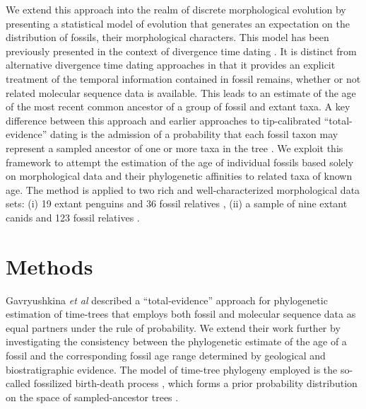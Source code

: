 \documentclass[11pt]{article}
\begin{document}
We extend this approach into the realm of discrete morphological evolution by presenting a statistical model of evolution that generates an expectation on the distribution of fossils, their morphological characters. 
This model has been previously presented in the context of divergence time dating \cite{gavr2014,gavryushkina2015bayesian}. 
It is distinct from alternative divergence time dating approaches in that it provides an explicit treatment of the temporal information contained in fossil remains, whether or not related molecular sequence data is available. 
This leads to an estimate of the age of the most recent common ancestor of a group of fossil and extant taxa. A key difference between this approach and earlier approaches to tip-calibrated ``total-evidence'' dating \cite{Ronq2012} is the admission of a probability that each fossil taxon may represent a sampled ancestor of one or more taxa  in the tree \cite{gavr2014}.
We exploit this framework to attempt the estimation of the age of individual fossils based solely on morphological data and their phylogenetic affinities to related taxa of known age. 
The method is applied to two rich and well-characterized morphological data sets: (i) 
19 extant penguins and 36 fossil relatives \cite{ksepka2010,ksepka2012}, (ii) a sample of nine extant canids and 123 fossil relatives \cite{Slater2015}.

\section*{Methods}

Gavryushkina {\it et al} \cite{gavryushkina2015bayesian} described a ``total-evidence'' approach \cite[implemented in BEAST2;][]{Beast2} for phylogenetic estimation of time-trees that employs both fossil and molecular sequence data as equal partners under the rule of probability. 
We extend their work further by investigating the consistency between the phylogenetic estimate of the age of a fossil and the corresponding fossil age range determined by geological and biostratigraphic evidence. 
The model of time-tree phylogeny employed is the so-called fossilized birth-death process \cite{Heath2014}, which forms a prior probability distribution on the space of sampled-ancestor trees \cite{Gavr2013}.
\end{document}
